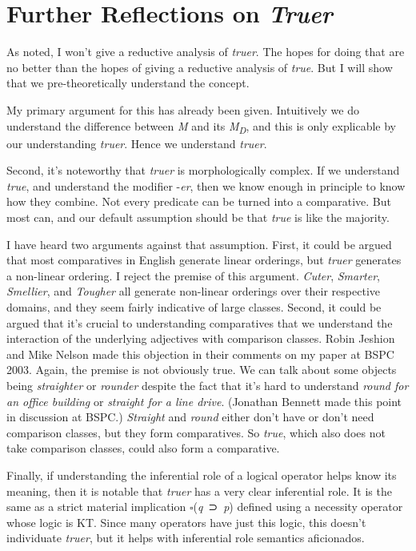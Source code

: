 \documentclass[
  11pt,
  letterpaper,
  DIV=11,
  numbers=noendperiod,
  twoside]{scrartcl}
\begin{document}
\section{\texorpdfstring{Further Reflections on
\emph{Truer}}{Further Reflections on Truer}}\label{further-reflections-on-truer}

As noted, I won't give a reductive analysis of \emph{truer}. The hopes
for doing that are no better than the hopes of giving a reductive
analysis of \emph{true}. But I will show that we pre-theoretically
understand the concept.

My primary argument for this has already been given. Intuitively we do
understand the difference between \emph{M} and its
\emph{M\textsubscript{D}}, and this is only explicable by our
understanding \emph{truer}. Hence we understand \emph{truer}.

Second, it's noteworthy that \emph{truer} is morphologically complex. If
we understand \emph{true}, and understand the modifier -\emph{er}, then
we know enough in principle to know how they combine. Not every
predicate can be turned into a comparative. But most can, and our
default assumption should be that \emph{true} is like the majority.

I have heard two arguments against that assumption. First, it could be
argued that most comparatives in English generate linear orderings, but
\emph{truer} generates a non-linear ordering. I reject the premise of
this argument. \emph{Cuter}, \emph{Smarter}, \emph{Smellier}, and
\emph{Tougher} all generate non-linear orderings over their respective
domains, and they seem fairly indicative of large classes. Second, it
could be argued that it's crucial to understanding comparatives that we
understand the interaction of the underlying adjectives with comparison
classes. Robin Jeshion and Mike Nelson made this objection in their
comments on my paper at BSPC 2003. Again, the premise is not obviously
true. We can talk about some objects being \emph{straighter} or
\emph{rounder} despite the fact that it's hard to understand \emph{round
for an office building} or \emph{straight for a line drive}. (Jonathan
Bennett made this point in discussion at BSPC.) \emph{Straight} and
\emph{round} either don't have or don't need comparison classes, but
they form comparatives. So \emph{true}, which also does not take
comparison classes, could also form a comparative.

Finally, if understanding the inferential role of a logical operator
helps know its meaning, then it is notable that \emph{truer} has a very
clear inferential role. It is the same as a strict material implication
\(\square\)(\emph{q}~⊃~\emph{p}) defined using a necessity operator
whose logic is KT. Since many operators have just this logic, this
doesn't individuate \emph{truer}, but it helps with inferential role
semantics aficionados.
\end{document}

